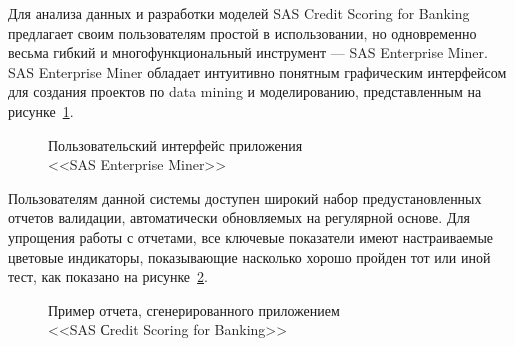 Для анализа данных и разработки моделей SAS Credit Scoring for Banking предлагает своим пользователям
простой в использовании, но одновременно весьма гибкий и многофункциональный инструмент ---
SAS Enterprise Miner. SAS Enterprise Miner обладает интуитивно понятным графическим интерфейсом для
создания проектов по data mining и моделированию, представленным на рисунке~\ref{fig:sas_miner}.

\begin{figure}[h!]
  \centering
  \caption{Пользовательский интерфейс приложения \\ <<SAS Enterprise Miner>>}
  \label{fig:sas_miner}
\end{figure}

Пользователям данной системы доступен широкий набор предустановленных отчетов валидации,
автоматически обновляемых на регулярной основе. Для упрощения работы с отчетами,
все ключевые показатели имеют настраиваемые цветовые индикаторы,
показывающие насколько хорошо пройден тот или иной тест, как показано на рисунке~\ref{fig:sas_tests}.

\begin{figure}[h!]
  \centering
  \caption{Пример отчета, сгенерированного приложением \\ <<SAS Сredit Scoring for Banking>>}
  \label{fig:sas_tests}
\end{figure}

